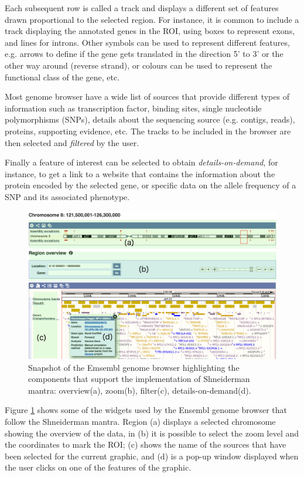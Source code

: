 Each subsequent row is called a track and displays a different set of features drawn proportional to the selected region. For instance, it is common to include a track displaying the annotated genes in the ROI, using boxes to represent exons, and lines for introns. Other symbols can be used to represent different features, e.g. arrows to define if the gene gets translated in the direction 5' to 3' or the other way around (reverse strand), or colours can be used to represent the functional class of the gene, etc.

Most genome browser have a wide list of sources that provide different types of information such as transcription factor, binding sites, single nucleotide polymorphisms (SNPs), details about the sequencing source (e.g. contigs, reads), proteins, supporting evidence, etc. The tracks to be included in the browser are then selected and \emph{filtered} by the user. 

Finally a feature of interest can be selected to obtain \emph{details-on-demand}, for instance, to get a link to a website that contains the information about the protein encoded by the selected gene, or specific data on the allele frequency of a SNP and its associated phenotype.

\begin{figure}  
\centering
\includegraphics[width=\textwidth]{figures/ensembl_snapshot.png}
\caption[Snapshot of the Emsembl genome browser.]{Snapshot of the Emsembl genome browser highlighting the components that support the implementation of Shneiderman mantra: overview(a), zoom(b), filter(c), details-on-demand(d).
\label{fig:ensembl_sn}}
\end{figure}

Figure \ref{fig:ensembl_sn} shows some of the widgets used by the Ensembl genome browser that follow the Shneiderman mantra. Region (a) displays a selected chromosome showing the overview of the data, in (b) it is possible to select the zoom level and the coordinates to mark the ROI; (c) shows the name of the sources that have been selected for the current graphic, and (d) is a pop-up window displayed when the user clicks on one of the features of the graphic.

